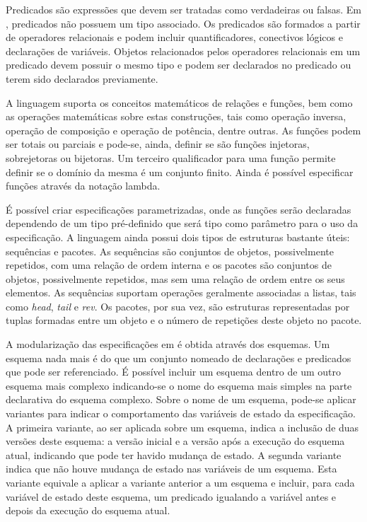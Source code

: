 Predicados são expressões que devem ser tratadas como verdadeiras ou falsas.
Em \Z, predicados não possuem um tipo associado.
Os predicados são formados a partir de operadores relacionais e podem incluir quantificadores, conectivos lógicos e declarações de variáveis.
Objetos relacionados pelos operadores relacionais em um predicado devem possuir o mesmo tipo e podem ser declarados no predicado ou terem sido declarados previamente.

A linguagem \Z suporta os conceitos matemáticos de relações e funções, bem como as operações matemáticas sobre estas construções, tais como operação inversa, operação de composição e operação de potência, dentre outras.
As funções podem ser totais ou parciais e pode-se, ainda, definir se são funções injetoras, sobrejetoras ou bijetoras.
Um terceiro qualificador para uma função permite definir se o domínio da mesma é um conjunto finito.
Ainda é possível especificar funções através da notação lambda.

É possível criar especificações parametrizadas, onde as funções serão declaradas dependendo de um tipo pré-definido que será tipo como parâmetro para o uso da especificação.
A linguagem ainda possui dois tipos de estruturas bastante úteis: sequências e pacotes.
As sequências são conjuntos de objetos, possivelmente repetidos, com uma relação de ordem interna e os pacotes são conjuntos de objetos, possivelmente repetidos, mas sem uma relação de ordem entre os seus elementos.
As sequências suportam operações geralmente associadas a listas, tais como \textit{head}, \textit{tail} e \textit{rev}.
Os pacotes, por sua vez, são estruturas representadas por tuplas formadas entre um objeto e o número de repetições deste objeto no pacote.

A modularização das especificações em \Z é obtida através dos esquemas.
Um esquema nada mais é do que um conjunto nomeado de declarações e predicados que pode ser referenciado.
É possível incluir um esquema dentro de um outro esquema mais complexo indicando-se o nome do esquema mais simples na parte declarativa do esquema complexo.
Sobre o nome de um esquema, pode-se aplicar variantes para indicar o comportamento das variáveis de estado da especificação.
A primeira variante, ao ser aplicada sobre um esquema, indica a inclusão de duas versões deste esquema: a versão inicial e a versão após a execução do esquema atual, indicando que pode ter havido mudança de estado.
A segunda variante indica que não houve mudança de estado nas variáveis de um esquema.
Esta variante equivale a aplicar a variante anterior a um esquema e incluir, para cada variável de estado deste esquema, um predicado igualando a variável antes e depois da execução do esquema atual.

